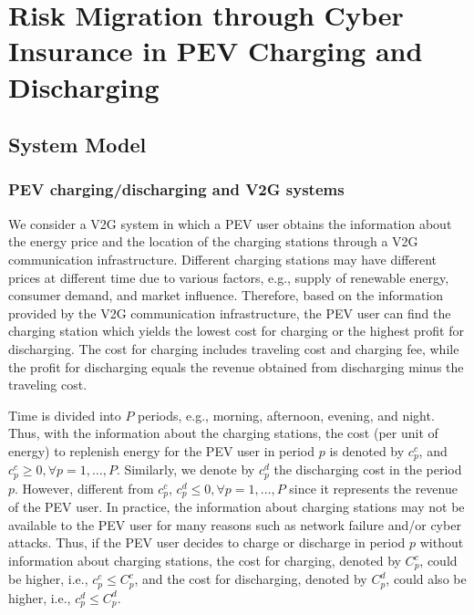 \documentclass[twocolumn,10pt]{IEEEtran}
\begin{document}
\section{Risk Migration through Cyber Insurance in PEV Charging and Discharging}%
\label{sec:RM_CI_PEV}


\subsection{System Model}


\subsubsection{PEV charging/discharging and V2G systems} 

We consider a V2G system in which a PEV user obtains the information about the energy price and the location of the charging stations through a V2G communication infrastructure. Different charging stations may have different prices at different time due to various factors, e.g., supply of renewable energy, consumer demand, and market influence. Therefore, based on the information provided by the V2G communication infrastructure, the PEV user can find the charging station which yields the lowest cost for charging or the highest profit for discharging. The cost for charging includes traveling cost and charging fee, while the profit for discharging equals the revenue obtained from discharging minus the traveling cost. 

Time is divided into $P$ periods, e.g., morning, afternoon, evening, and night. Thus, with the information about the charging stations, the cost (per unit of energy) to replenish energy for the PEV user in period $p$ is denoted by $c^{c}_p$, and $c^{c}_p \geq 0, \forall p = 1,\ldots,P$. Similarly, we denote by $c^{d}_p$ the discharging cost in the period $p$. However, different from $c^{c}_p$, $c^{d}_p \leq 0, \forall p = 1,\ldots,P$ since it represents the revenue of the PEV user. In practice, the information about charging stations may not be available to the PEV user for many reasons such as network failure and/or cyber attacks. Thus, if the PEV user decides to charge or discharge in period $p$ without information about charging stations, the cost for charging, denoted by $C^{c}_p$, could be higher, i.e., $c^{c}_p \leq C^{c}_p$, and the cost for discharging, denoted by $C^{d}_p$, could also be higher, i.e., $c^{d}_p \leq C^{d}_p$. 
\end{document}
